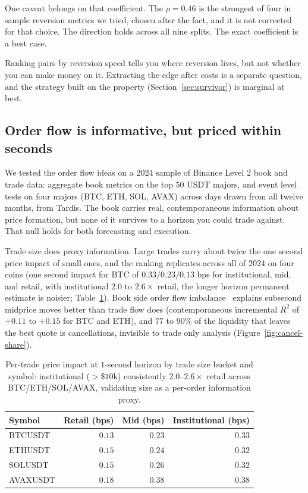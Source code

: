 \documentclass[11pt]{article}
\begin{document}
One caveat belongs on that coefficient. The $\rho = 0.46$ is the strongest of four in sample
reversion metrics we tried, chosen after the fact, and it is not corrected for that choice. The
direction holds across all nine splits. The exact coefficient is a best case.

Ranking pairs by reversion speed tells you where reversion lives, but not whether you can make
money on it. Extracting the edge after costs is a separate question, and the strategy built on the
property (Section~\ref{sec:survivor}) is marginal at best.

\subsection{Order flow is informative, but priced within seconds}

We tested the order flow ideas on a 2024 sample of Binance Level 2 book and trade data: aggregate
book metrics on the top 50 USDT majors, and event level tests on four majors (BTC, ETH, SOL,
AVAX) across days drawn from all twelve months, from Tardis. The book carries real,
contemporaneous information about price formation, but none of it survives to a horizon you could
trade against. That null holds for both forecasting and execution.

Trade size does proxy information. Large trades carry about twice the one second price impact of
small ones, and the ranking replicates across all of 2024 on four coins (one second impact for
BTC of $0.33/0.23/0.13$ bps for institutional, mid, and retail, with institutional $2.0$ to
$2.6\times$ retail, the longer horizon permanent estimate is noisier;
Table~\ref{tab:institutional-impact}). Book side order flow
imbalance~\cite{contkukanovstoikov2014} explains subsecond midprice moves better than trade flow does (contemporaneous incremental $R^2$
of $+0.11$ to $+0.15$ for BTC and ETH), and $77$ to $90\%$ of the liquidity that leaves the best
quote is cancellations, invisible to trade only analysis (Figure~\ref{fig:cancel-share}).

\begin{table}[h]
\centering
\caption{Per-trade price impact at $1$-second horizon by trade size bucket and symbol: institutional
($>$\$$10$k) consistently $2.0$--$2.6\times$ retail across BTC/ETH/SOL/AVAX, validating
size as a per-order information proxy.}
\label{tab:institutional-impact}
\begin{tabular}{lrrr}
\toprule
Symbol & Retail (bps) & Mid (bps) & Institutional (bps) \\
\midrule
BTCUSDT & $0.13$ & $0.23$ & $0.33$ \\
ETHUSDT & $0.15$ & $0.24$ & $0.32$ \\
SOLUSDT & $0.15$ & $0.26$ & $0.32$ \\
AVAXUSDT & $0.18$ & $0.38$ & $0.38$ \\
\bottomrule
\end{tabular}
\end{table}
\end{document}
